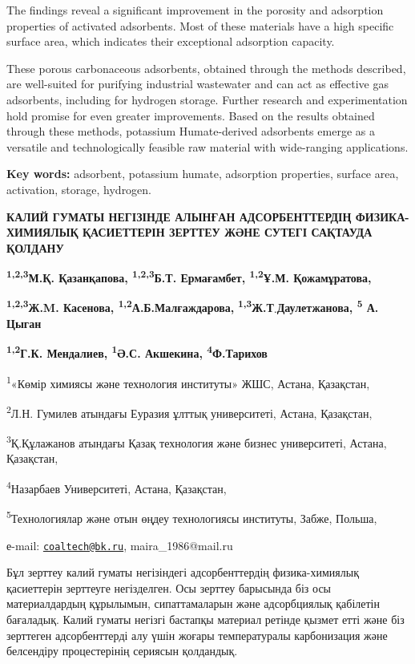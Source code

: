 The findings reveal a significant improvement in the porosity and
adsorption properties of activated adsorbents. Most of these materials
have a high specific surface area, which indicates their exceptional
adsorption capacity.

These porous carbonaceous adsorbents, obtained through the methods
described, are well-suited for purifying industrial wastewater and can
act as effective gas adsorbents, including for hydrogen storage. Further
research and experimentation hold promise for even greater improvements.
Based on the results obtained through these methods, potassium
Humate-derived adsorbents emerge as a versatile and technologically
feasible raw material with wide-ranging applications.

{\bfseries Key words:} adsorbent, potassium humate, adsorption properties,
surface area, activation, storage, hydrogen.

{\bfseries КАЛИЙ ГУМАТЫ НЕГІЗІНДЕ АЛЫНҒАН АДСОРБЕНТТЕРДІҢ ФИЗИКА-ХИМИЯЛЫҚ
ҚАСИЕТТЕРІН ЗЕРТТЕУ ЖӘНЕ СУТЕГІ САҚТАУДА ҚОЛДАНУ}

{\bfseries \textsuperscript{1,2,3}М.Қ. Қазанқапова\textsuperscript{\envelope },
\textsuperscript{1,2,3}Б.Т. Ермағамбет, \textsuperscript{1,2}Ұ.М.
Қожамұратова,}

{\bfseries \textsuperscript{1,2,3}Ж.M. Касенова,
\textsuperscript{1,2}А.Б.Малғаждарова,}
{\bfseries \textsuperscript{1,3}Ж.Т}.{\bfseries Даулетжанова,
\textsuperscript{5} А. Цыган}

{\bfseries \textsuperscript{1,2}Г.К. Мендалиев, \textsuperscript{1}Ә.С.
Акшекина, \textsuperscript{4}Ф.Тарихов}

\textsuperscript{1}«Көмір химиясы және технология институты» ЖШС,
Астана, Қазақстан,

\textsuperscript{2}Л.Н. Гумилев атындағы Еуразия ұлттық университеті,
Астана, Қазақстан,

\textsuperscript{3}Қ.Құлажанов атындағы Қазақ технология және бизнес
университеті, Астана, Қазақстан,

\textsuperscript{4}Назарбаев Университеті, Астана, Қазақстан,

\textsuperscript{5}Технологиялар және отын өңдеу технологиясы институты,
Забже, Польша,

е-mail: \href{mailto:coaltech@bk.ru}{\nolinkurl{coaltech@bk.ru}},
maira\_1986@mail.ru

Бұл зерттеу калий гуматы негізіндегі адсорбенттердің физика-химиялық
қасиеттерін зерттеуге негізделген. Осы зерттеу барысында біз осы
материалдардың құрылымын, сипаттамаларын және адсорбциялық қабілетін
бағаладық. Калий гуматы негізгі бастапқы материал ретінде қызмет етті
және біз зерттеген адсорбенттерді алу үшін жоғары температуралы
карбонизация және белсендіру процестерінің сериясын қолдандық.

